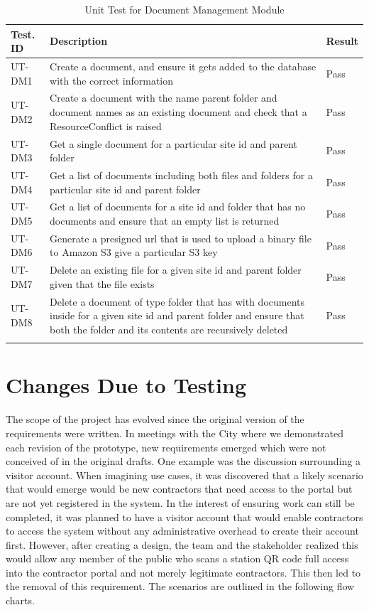 \documentclass[12pt, titlepage]{article}
\begin{document}
\begin{longtable}{|m{2cm}|m{10cm}|m{1.4cm}|}
  \hline
  \textbf{Test. ID} & \textbf{Description} & \textbf{Result} \\ \hline
  UT-DM1 & Create a document, and ensure it gets added to the
  database with the correct information & Pass\\ \hline
  UT-DM2 & Create a document with the name parent folder and document names as
  an existing document and check that a ResourceConflict is raised &
  Pass\\ \hline
  UT-DM3 & Get a single document for a particular site id and parent
  folder & Pass\\ \hline
  UT-DM4 & Get a list of documents including both files and folders for a
  particular site id and parent folder & Pass\\ \hline
  UT-DM5 & Get a list of documents for a site id and folder that has no
  documents and ensure that an empty list is returned & Pass\\ \hline
  UT-DM6 & Generate a presigned url that is used to upload a binary file to
  Amazon S3 give a particular S3 key & Pass\\ \hline
  UT-DM7 & Delete an existing file for a given site id and parent folder given
  that the file exists & Pass\\ \hline
  UT-DM8 & Delete a document of type folder that has with documents
  inside for a given site id
  and parent folder and ensure that both the folder and its contents are
  recursively deleted & Pass\\ \hline
  \caption{Unit Test for Document Management Module}
\end{longtable}

\section{Changes Due to Testing}

The scope of the project has evolved since the original version of
the requirements were written.
In meetings with the City where we demonstrated each revision of the
prototype, new requirements emerged which were not conceived
of in the original drafts. One example was the discussion surrounding
a visitor account. When imagining use cases, it was discovered
that a likely scenario that would emerge would be new contractors
that need access to the portal but are not yet registered in the
system. In the interest of ensuring work can still be completed, it
was planned to have a visitor account that would enable contractors
to access the system without any administrative overhead to create
their account first. However, after creating a design, the team and
the stakeholder realized this would allow any member of the public
who scans a station QR code full access into the contractor portal and
not merely legitimate contractors. This then led to the removal of
this requirement. The scenarios are outlined in the following flow charts.
\newpage
\end{document}
